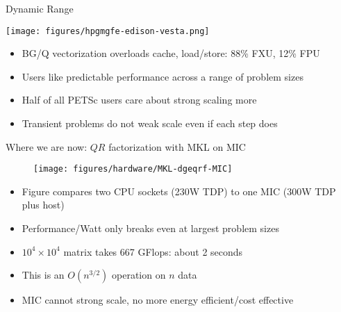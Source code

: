 \documentclass{beamer}
\begin{document}
\begin{frame}{Dynamic Range}
  \begin{center}
    \texttt{[image: figures/hpgmgfe-edison-vesta.png]}
  \end{center}
  \begin{itemize}
  \item BG/Q vectorization overloads cache, load/store: 88\% FXU, 12\% FPU
  \item Users like predictable performance across a range of problem sizes
  \item Half of all PETSc users care about strong scaling more
  \item Transient problems do not weak scale even if each step does
  \end{itemize}
\end{frame}

\begin{frame}{Where we are now: $QR$ factorization with MKL on MIC}
  \begin{figure}
    \centering
    \texttt{[image: figures/hardware/MKL-dgeqrf-MIC]}
  \end{figure}
  \begin{itemize}
  \item Figure compares two CPU sockets (230W TDP) to one MIC (300W TDP plus host)
  \item Performance/Watt only breaks even at largest problem sizes
  \item $10^4 \times 10^4$ matrix takes 667 GFlops: about 2 seconds
  \item This is an $O(n^{3/2})$ operation on $n$ data
  \item MIC cannot strong scale, no more energy efficient/cost effective
  \end{itemize}
\end{frame}
\end{document}
